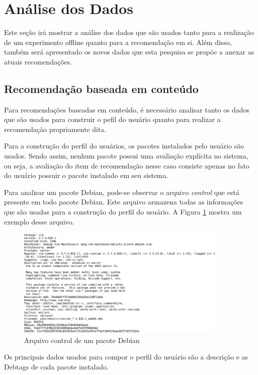 \section{Análise dos Dados}

Este seção irá mostrar a análise dos dados que são usados tanto para a
realização de um experimento offline quanto para a recomendação em si. Além
disso, também será apresentado os novos dados que esta pesquisa se propõe a
anexar as atuais recomendações.

\subsection{Recomendação baseada em conteúdo}

Para recomendações baseadas em conteúdo, é necessário analisar tanto os dados
que são usados para construir o pefil do usuário quanto para realizar a
recomendação propriamente dita.

Para a construção do perfil do usuários, os pacotes instalados pelo usuário são
usados. Sendo assim, nenhum pacote possui uma avaliação explícita no sistema,
ou seja, a avaliação do item de recomendação nesse caso consiste apenas no fato
do usuário possuir o pacote instalado em seu sistema.

Para analisar um pacote Debian, pode-se observar o arquivo \textit{control} que
está presente em todo pacote Debian. Este arquivo
armazena todas as informações que são usadas para a construção do perfil do
usuário. A Figura \ref{fig:control_pacote} mostra um exemplo desse arquivo.

\begin{figure}[h]
  \centering
  \includegraphics[width=0.9\textwidth]{figuras/control_pacote.eps}
  \caption{Arquivo control de um pacote Debian}
  \label{fig:control_pacote}
\end{figure}

Os principais dados usados para compor o perfil do usuário são a
descrição e as Debtags de cada pacote instalado.

